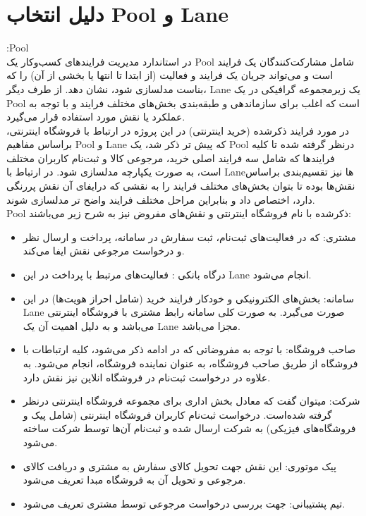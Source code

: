 \documentclass[14pt]{article}
\begin{document}
\tableofcontents


\pagebreak

\section{دلیل انتخاب Pool و Lane}


:Pool\\
در استاندارد مدیریت فرایندهای کسب‌‌‌‌‌وکار یک Pool شامل مشارکت‌کنندگان یک فرایند است و می‌تواند جریان یک فرایند و فعالیت (از ابتدا تا انتها یا بخشی از آن) را که بناست مدلسازی شود، نشان دهد. از طرف دیگر، Lane یک زیرمجموعه گرافیکی در یک Pool است که اغلب برای سازماندهی و طبقه‌بندی بخش‌های مختلف فرایند  و با توجه به عملکرد یا نقش مورد استفاده قرار می‌گیرد.\\
در مورد فرایند ذکرشده (خرید اینترنتی) در این پروژه در ارتباط با فروشگاه اینترنتی،  براساس مفاهیم Pool و Lane که پیش تر ذکر شد، یک Pool درنظر گرفته شده تا کلیه فرایندها که شامل سه فرایند اصلی خرید، مرجوعی کالا و ثبت‌نام کاربران مختلف است، به صورت یکپارچه مدلسازی شود. در ارتباط با Lane‌ها نیز تقسیم‌بندی براساس نقش‌ها بوده تا بتوان بخش‌های مختلف فرایند را به نقشی که درایفای آن نقش پررنگی دارد،‌ اختصاص داد و بنابراین مراحل مختلف فرایند واضح تر مدلسازی شوند.\\
Pool ذکرشده با نام فروشگاه اینترنتی و نقش‌های مفروض نیز به شرح زیر می‌باشند:

\begin{flushright}
\begin{itemize}
\item مشتری: که در فعالیت‌های ثبت‌نام، ثبت سفارش در سامانه، پرداخت و ارسال نظر و درخواست مرجوعی نقش ایفا می‌کند.
\item درگاه بانکی : فعالیت‌های مرتبط با پرداخت در این Lane انجام می‌شود.
\item سامانه: بخش‌های الکترونیکی و خودکار فرایند خرید (شامل احراز هویت‌ها) در این Lane صورت می‌گیرد. به صورت کلی سامانه رابط مشتری با فروشگاه اینترنتی می‌باشد و به دلیل اهمیت آن یک Lane مجزا می‌باشد.
\item صاحب فروشگاه: با توجه به مفروضاتی که در ادامه ذکر می‌شود، کلیه ارتباطات با فروشگاه از طریق صاحب فروشگاه، به عنوان نماینده فروشگاه، انجام می‌شود. به علاوه در درخواست ثبت‌نام در فروشگاه انلاین نیز نقش دارد.
\item شرکت: میتوان گفت که معادل بخش اداری برای مجموعه فروشگاه اینترنتی درنظر گرفته شده‌است. درخواست ثبت‌نام کاربران فروشگاه اینترنتی‌ (شامل پیک و فروشگاه‌های فیزیکی)‌ به شرکت ارسال شده و ثبت‌نام آن‌ها  توسط شرکت ساخته می‌شود.
\item پیک موتوری: این نقش جهت تحویل کالای سفارش به مشتری و دریافت کالای مرجوعی و تحویل آن به فروشگاه مبدا تعریف می‌شود.
\item تیم پشتیبانی:‌ جهت بررسی درخواست مرجوعی توسط مشتری تعریف می‌شود.
\end{itemize}
\end{flushright}
\end{document}
